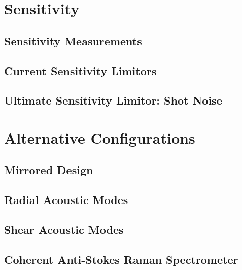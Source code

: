 \documentclass[
sn-nature,
twocolumn
]{sn-jnl}%
\begin{document}
\begin{appendices}
\section{Sensitivity}
\subsection{Sensitivity Measurements}
\subsection{Current Sensitivity Limitors}
\subsection{Ultimate Sensitivity Limitor: Shot Noise}

\section{Alternative Configurations}
\subsection{Mirrored Design}
\subsection{Radial Acoustic Modes}
\subsection{Shear Acoustic Modes}
\subsection{Coherent Anti-Stokes Raman Spectrometer}

\end{appendices}
\end{document}
